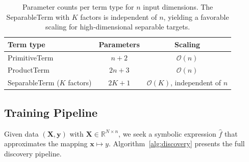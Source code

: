 \begin{table}[t]
\centering
\caption{Parameter counts per term type for $n$ input dimensions.  The SeparableTerm
with $K$ factors is independent of $n$, yielding a favorable scaling for
high-dimensional separable targets.}
\label{tab:param_counts}
\smallskip
\begin{tabular}{lcc}
\toprule
\textbf{Term type} & \textbf{Parameters} & \textbf{Scaling} \\
\midrule
PrimitiveTerm     & $n + 2$   & $\mathcal{O}(n)$ \\
ProductTerm       & $2n + 3$  & $\mathcal{O}(n)$ \\
SeparableTerm ($K$ factors) & $2K + 1$  & $\mathcal{O}(K)$, independent of $n$ \\
\bottomrule
\end{tabular}
\end{table}

\subsection{Training Pipeline}
\label{sec:pipeline}

Given data $(\mathbf{X}, \mathbf{y})$ with $\mathbf{X} \in \mathbb{R}^{N \times n}$,
we seek a symbolic expression $\hat{f}$ that approximates the mapping
$\mathbf{x} \mapsto y$.  Algorithm~\ref{alg:discovery} presents the full
discovery pipeline.

